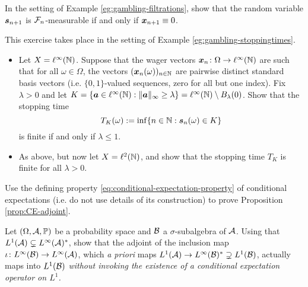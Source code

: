 \begin{exercise}\label{ex:winnings-unpredictability}
  In the setting of Example \ref{eg:gambling-filtrations}, show that the random variable $\bm{s}_{n+1}$ is $\mathcal{F}_n$-measurable if and only if $\bm{x}_{n+1} \equiv 0$.
\end{exercise}

\begin{exercise}\label{ex:gambling-in-linfty}
  This exercise takes place in the setting of Example \ref{eg:gambling-stoppingtimes}.
  \begin{itemize}
  \item
    Let $X = \ell^\infty(\mathbb{N})$.
    Suppose that the wager vectors $\bm{x}_n \colon \Omega \rightarrow \ell^\infty(\mathbb{N})$ are such that for all $\omega \in \Omega$, the vectors $(\bm{x}_n(\omega))_{n \in \mathbb{N}}$ are pairwise distinct standard basis vectors (i.e. $\{0,1\}$-valued sequences, zero for all but one index).
    Fix $\lambda > 0$ and let $K = \{\bm{a} \in \ell^\infty(\mathbb{N}) : \|\bm{a}\|_\infty \geq \lambda\} = \ell^\infty(\mathbb{N}) \setminus B_\lambda(0)$.
    Show that the stopping time
    \begin{equation*}
      T_K(\omega) := \inf\{n \in \mathbb{N} : \bm{s}_n(\omega) \in K\} 
    \end{equation*}
    is finite if and only if $\lambda \leq 1$.
  \item
    As above, but now let $X = \ell^2(\mathbb{N})$, and show that the stopping time $T_K$ is finite for all $\lambda > 0$.
  \end{itemize}
\end{exercise}

\begin{exercise}\label{ex:CE-adjoint}
  Use the defining property \eqref{eq:conditional-expectation-property} of conditional expectations (i.e. do not use details of its construction) to prove Proposition \ref{prop:CE-adjoint}.
\end{exercise}

\begin{exercise}\label{ex:conditional-expectation-as-adjoint}
  Let $(\Omega,\mathcal{A},\mathbb{P})$ be a probability space and $\mathcal{B}$ a $\sigma$-subalgebra of $\mathcal{A}$.
  Using that $L^1(\mathcal{A}) \subsetneq L^\infty(\mathcal{A})^*$, show that the adjoint of the inclusion map $\iota \colon L^\infty(\mathcal{B}) \rightarrow L^\infty(\mathcal{A})$, which \emph{a priori} maps $L^1(\mathcal{A}) \to L^\infty(\mathcal{B})^* \supsetneq L^1(\mathcal{B})$, actually maps into $L^1(\mathcal{B})$ \emph{without invoking the existence of a conditional expectation operator on $L^1$.}
\end{exercise}

